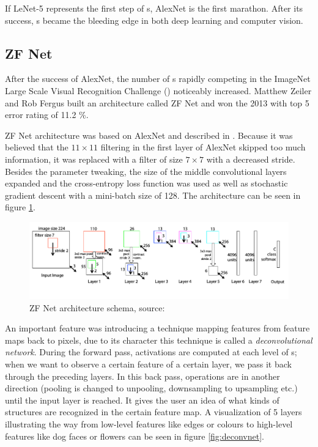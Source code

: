 If LeNet-5 represents the first step of s, AlexNet is the first marathon. After its success, s became the bleeding edge in both deep learning and computer vision. 


\subsection{ZF Net}
\label{zfnet}

After the success of AlexNet, the number of s rapidly competing in the ImageNet Large Scale Visual Recognition Challenge () noticeably increased. Matthew Zeiler and Rob Fergus built an architecture called ZF Net and won the  2013 with top 5 error rating of 11.2 \%. 

ZF Net architecture was based on AlexNet and described in \cite{zf-net}. Because it was believed that the $11 \times 11$ filtering in the first layer of AlexNet skipped too much information, it was replaced with a filter of size $7 \times 7$ with a decreased stride. Besides the parameter tweaking, the size of the middle convolutional layers expanded and the cross-entropy loss function was used as well as stochastic gradient descent with a mini-batch size of 128. The architecture can be seen in figure \ref{fig:zf-net}.

\begin{figure}[H]
   \centering
	\includegraphics[width=\linewidth]{./pictures/zf-net.png}
	\caption[ZF Net architecture]{ZF Net architecture schema, source: \cite{zf-net}}
      \label{fig:zf-net}
\end{figure}

An important feature was introducing a technique mapping features from feature maps back to pixels, due to its character this technique is called a \textit{deconvolutional network}. During the forward pass, activations are computed at each level of s; when we want to observe a certain feature of a certain layer, we pass it back through the preceding layers. In this back pass, operations are in another direction (pooling is changed to unpooling, downsampling to upsampling etc.) until the input layer is reached. It gives the user an idea of what kinds of structures are recognized in the certain feature map. A visualization of 5 layers illustrating the way from low-level features like edges or colours to high-level features like dog faces or flowers can be seen in figure \ref{fig:deconvnet}.

